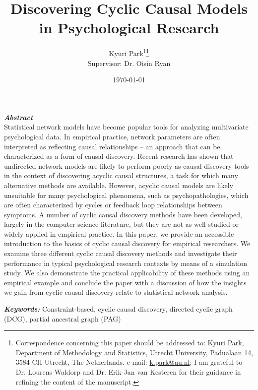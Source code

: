 \documentclass[twoside, 11pt]{article}
\title{Discovering Cyclic Causal Models in Psychological Research 
}
\author[1]{\Large{Kyuri Park\textsuperscript{1}}\thanks{Correspondence concerning this paper should be addressed to: Kyuri Park, Department of Methodology and Statistics, Utrecht University, Padualaan 14, 3584 CH Utrecht, The Netherlands. e-mail: \href{mailto:k.park@uu.nl}{k.park@uu.nl}; I am grateful to Dr. Lourens Waldorp and Dr. Erik-Jan van Kesteren for their guidance in refining the content of the  manuscript.} \\

\Large{Supervisor: Dr. Ois\'{i}n Ryan}}
\affil[1]{Department of Methodology and Statistics, Utrecht University}%
\date{\today}
\begin{document}
\maketitle
\thispagestyle{firstpage}

\begin{adjustwidth}{1.5cm}{1.5cm}

\noindent \textbf{\textit{Abstract }} \\
\noindent Statistical network models have become popular tools for analyzing multivariate psychological data. In empirical practice, network parameters are often interpreted as reflecting causal relationships – an approach that can be characterized as a form of causal discovery. Recent research has shown that undirected network models are likely to perform poorly as causal discovery tools in the context of discovering acyclic causal structures, a task for which many alternative methods are available. However, acyclic causal models are likely unsuitable for many psychological phenomena, such as psychopathologies, which are often characterized by cycles or feedback loop relationships between symptoms. A number of cyclic causal discovery methods have been developed, largely in the computer science literature, but they are not as well studied or widely applied in empirical practice. In this paper, we provide an accessible introduction to the basics of cyclic causal discovery for empirical researchers. We examine three different cyclic causal discovery methods and investigate their performance in typical psychological research contexts by means of a simulation study. We also demonstrate the practical applicability of these methods using an empirical example and conclude the paper with a discussion of how the insights we gain from cyclic causal discovery relate to statistical network analysis.


\vspace{1.5mm}
\noindent\textbf{{\textit{Keywords: }}}%
Constraint-based, cyclic causal discovery, directed cyclic graph (DCG), partial ancestral graph (PAG)\\
\end{adjustwidth}



\end{document}
